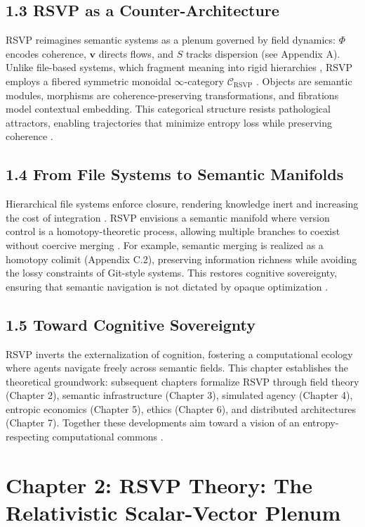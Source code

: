 \documentclass[12pt]{article}
\begin{document}
\subsection*{1.3 RSVP as a Counter-Architecture}
RSVP reimagines semantic systems as a plenum governed by field dynamics: \(\Phi\) encodes coherence, \(\mathbf{v}\) directs flows, and \(S\) tracks dispersion (see Appendix A). Unlike file-based systems, which fragment meaning into rigid hierarchies \citep{bird1988}, RSVP employs a fibered symmetric monoidal \(\infty\)-category \(\mathcal{C}_{\text{RSVP}}\) \citep{maclane1998}. Objects are semantic modules, morphisms are coherence-preserving transformations, and fibrations model contextual embedding. This categorical structure resists pathological attractors, enabling trajectories that minimize entropy loss while preserving coherence \citep{baez2011}.
\subsection*{1.4 From File Systems to Semantic Manifolds}
Hierarchical file systems enforce closure, rendering knowledge inert and increasing the cost of integration \citep{whitehead1978}. RSVP envisions a semantic manifold where version control is a homotopy-theoretic process, allowing multiple branches to coexist without coercive merging \citep{hatcher2002}. For example, semantic merging is realized as a homotopy colimit (Appendix C.2), preserving information richness while avoiding the lossy constraints of Git-style systems. This restores cognitive sovereignty, ensuring that semantic navigation is not dictated by opaque optimization \citep{ortega1957}.
\subsection*{1.5 Toward Cognitive Sovereignty}
RSVP inverts the externalization of cognition, fostering a computational ecology where agents navigate freely across semantic fields. This chapter establishes the theoretical groundwork: subsequent chapters formalize RSVP through field theory (Chapter 2), semantic infrastructure (Chapter 3), simulated agency (Chapter 4), entropic economics (Chapter 5), ethics (Chapter 6), and distributed architectures (Chapter 7). Together these developments aim toward a vision of an entropy-respecting computational commons \citep{atiyah1969, milewski2018}.

\section*{Chapter 2: RSVP Theory: The Relativistic Scalar-Vector Plenum}
\end{document}
